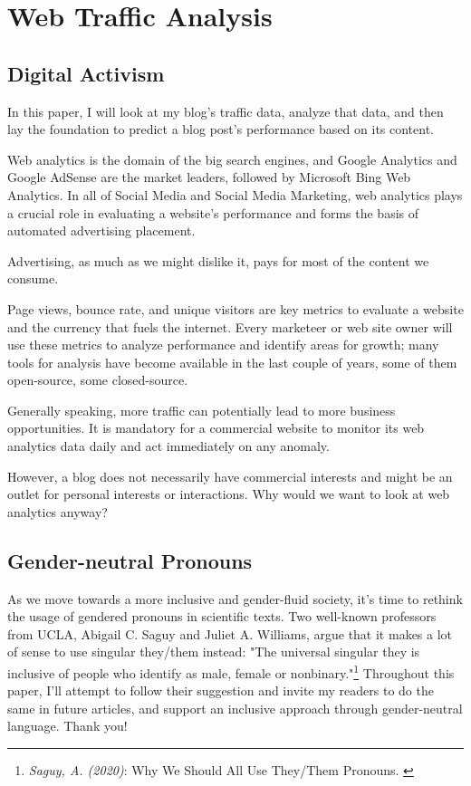 %
%

\pagebreak
\section{Web Traffic Analysis}

\onehalfspacing

\subsection{Digital Activism}

In this paper, I will look at my blog's traffic data, analyze that data, and then lay the foundation to predict a blog post's performance based on its content.

Web analytics is the domain of the big search engines, and Google Analytics and Google AdSense are the market leaders, followed by Microsoft Bing Web Analytics. In all of Social Media and Social Media Marketing, web analytics plays a crucial role in evaluating a website's performance and forms the basis of automated advertising placement.

Advertising, as much as we might dislike it, pays for most of the content we consume.

Page views, bounce rate, and unique visitors are key metrics to evaluate a website and the currency that fuels the internet. Every marketeer or web site owner will use these metrics to analyze performance and identify areas for growth; many tools for analysis have become available in the last couple of years, some of them open-source, some closed-source.

Generally speaking, more traffic can potentially lead to more business opportunities. It is mandatory for a commercial website to monitor its web analytics data daily and act immediately on any anomaly.

However, a blog does not necessarily have commercial interests and might be an outlet for personal interests or interactions. Why would we want to look at web analytics anyway?

\subsection{Gender-neutral Pronouns}

As we move towards a more inclusive and gender-fluid society, it's time to rethink the usage of gendered pronouns in scientific texts. Two well-known professors from UCLA, Abigail C. Saguy and Juliet A. Williams, argue that it makes a lot of sense to use singular they/them instead: "The universal singular they is inclusive of people who identify as male, female or nonbinary."\footnote{\textit{Saguy, A. (2020)}: Why We Should All Use They/Them Pronouns. \cite{pronouns}} Throughout this paper, I'll attempt to follow their suggestion and invite my readers to do the same in future articles, and support an inclusive approach through gender-neutral language. Thank you!

